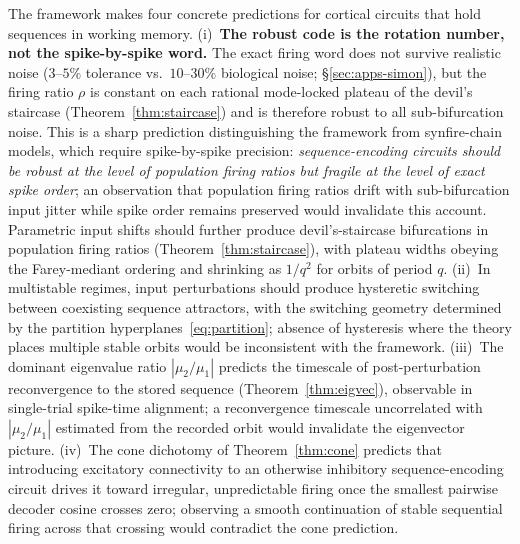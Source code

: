 \documentclass[12pt]{article}
\begin{document}
The framework makes four concrete predictions for cortical circuits that hold sequences in working memory. (i)~\textbf{The robust code is the rotation number, not the spike-by-spike word.} The exact firing word does not survive realistic noise ($3$--$5\%$ tolerance vs.\ $10$--$30\%$ biological noise; \S\ref{sec:apps-simon}), but the firing ratio $\rho$ is constant on each rational mode-locked plateau of the devil's staircase (Theorem~\ref{thm:staircase}) and is therefore robust to all sub-bifurcation noise. This is a sharp prediction distinguishing the framework from synfire-chain models, which require spike-by-spike precision: \emph{sequence-encoding circuits should be robust at the level of population firing ratios but fragile at the level of exact spike order}; an observation that population firing ratios drift with sub-bifurcation input jitter while spike order remains preserved would invalidate this account. Parametric input shifts should further produce devil's-staircase bifurcations in population firing ratios (Theorem~\ref{thm:staircase}), with plateau widths obeying the Farey-mediant ordering and shrinking as $1/q^2$ for orbits of period $q$. (ii)~In multistable regimes, input perturbations should produce hysteretic switching between coexisting sequence attractors, with the switching geometry determined by the partition hyperplanes~\eqref{eq:partition}; absence of hysteresis where the theory places multiple stable orbits would be inconsistent with the framework. (iii)~The dominant eigenvalue ratio $|\mu_2/\mu_1|$ predicts the timescale of post-perturbation reconvergence to the stored sequence (Theorem~\ref{thm:eigvec}), observable in single-trial spike-time alignment; a reconvergence timescale uncorrelated with $|\mu_2/\mu_1|$ estimated from the recorded orbit would invalidate the eigenvector picture. (iv)~The cone dichotomy of Theorem~\ref{thm:cone} predicts that introducing excitatory connectivity to an otherwise inhibitory sequence-encoding circuit drives it toward irregular, unpredictable firing once the smallest pairwise decoder cosine crosses zero; observing a smooth continuation of stable sequential firing across that crossing would contradict the cone prediction.
\end{document}
